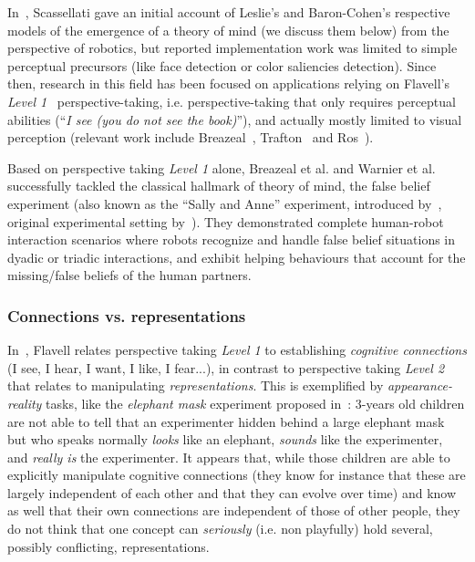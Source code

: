 \documentclass[a4paper]{article}
\newcommand{\etal}{et al.\xspace}
\newcommand{\ie}{i.e.\xspace}
\begin{document}
In~\cite{scassellati2002theory}, Scassellati gave
an initial account of Leslie's and Baron-Cohen's respective models of the
emergence of a theory of mind (we discuss them below) from the perspective of
robotics, but reported implementation work was limited to simple perceptual
precursors (like face detection or color saliencies detection). Since then,
research in this field has been focused on applications relying on Flavell's
\emph{Level 1}~\cite{flavell1977development} perspective-taking, \ie
perspective-taking that only requires perceptual abilities (``\emph{I see (you do
not see the book)}''), and actually mostly limited to visual perception (relevant
work include Breazeal~\cite{breazeal2006using}, Trafton~\cite{Trafton2005} and
Ros~\cite{Ros2010}).

Based on perspective taking \emph{Level 1} alone, Breazeal
\etal\cite{breazeal2009embodied} and Warnier \etal\cite{warnier2012when}
successfully tackled the classical hallmark of theory of mind, the false belief
experiment (also known as the ``Sally and Anne'' experiment, introduced
by~\cite{wimmer1983beliefs}, original experimental setting
by~\cite{baron1985does}). They demonstrated complete human-robot interaction
scenarios where robots recognize and handle false belief situations in dyadic or
triadic interactions, and exhibit helping behaviours that account for the
missing/false beliefs of the human partners.

\cite{devin2016implemented}

\subsubsection{Connections vs. representations}
\label{connection-representation}

In~\cite{flavell1990developmental}, Flavell relates perspective taking
\emph{Level 1} to establishing \emph{cognitive connections} (I see, I hear, I
want, I like, I fear...), in contrast to perspective taking \emph{Level 2} that
relates to manipulating \emph{representations}.  This is exemplified by
\emph{appearance-reality} tasks, like the \emph{elephant mask} experiment
proposed in~\cite{flavell1990developmental}: 3-years old children are not able
to tell that an experimenter hidden behind a large elephant mask but who speaks
normally \emph{looks} like an elephant, \emph{sounds} like the experimenter, and
\emph{really is} the experimenter.  It appears that, while those children are
able to explicitly manipulate cognitive connections (they know for instance that
these are largely independent of each other and that they can evolve over time)
and know as well that their own connections are independent of those of other
people, they do not think that one concept can \emph{seriously} (\ie non
playfully) hold several, possibly conflicting, representations.
\end{document}
